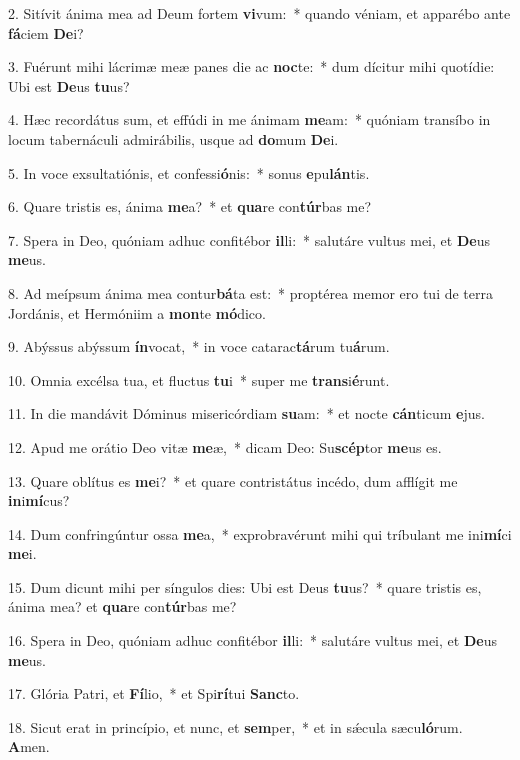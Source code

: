 2. Sitívit ánima mea ad Deum fortem \textbf{vi}vum:~*  quando véniam, et apparébo ante \textbf{fá}ciem \textbf{De}i?\

3. Fuérunt mihi lácrimæ meæ panes die ac \textbf{noc}te:~*  dum dícitur mihi quotídie: Ubi est \textbf{De}us \textbf{tu}us?\

4. Hæc recordátus sum, et effúdi in me ánimam \textbf{me}am:~*  quóniam transíbo in locum tabernáculi admirábilis, usque ad \textbf{do}mum \textbf{De}i.\

5. In voce exsultatiónis, et confessi\textbf{ó}nis:~*  sonus \textbf{e}pu\textbf{lán}tis.\

6. Quare tristis es, ánima \textbf{me}a?~*  et \textbf{qua}re con\textbf{túr}bas me?\

7. Spera in Deo, quóniam adhuc confitébor \textbf{il}li:~*  salutáre vultus mei, et \textbf{De}us \textbf{me}us.\

8. Ad meípsum ánima mea contur\textbf{bá}ta est:~*  proptérea memor ero tui de terra Jordánis, et Hermóniim a \textbf{mon}te \textbf{mó}dico.\

9. Abýssus abýssum \textbf{ín}vocat,~*  in voce catarac\textbf{tá}rum tu\textbf{á}rum.\

10. Omnia excélsa tua, et fluctus \textbf{tu}i~*  super me \textbf{trans}i\textbf{é}runt.\

11. In die mandávit Dóminus misericórdiam \textbf{su}am:~*  et nocte \textbf{cán}ticum \textbf{e}jus.\

12. Apud me orátio Deo vitæ \textbf{me}æ,~*  dicam Deo: Su\textbf{scép}tor \textbf{me}us es.\

13. Quare oblítus es \textbf{me}i?~*  et quare contristátus incédo, dum afflígit me \textbf{in}i\textbf{mí}cus?\

14. Dum confringúntur ossa \textbf{me}a,~*  exprobravérunt mihi qui tríbulant me ini\textbf{mí}ci \textbf{me}i.\

15. Dum dicunt mihi per síngulos dies: Ubi est Deus \textbf{tu}us?~*  quare tristis es, ánima mea? et \textbf{qua}re con\textbf{túr}bas me?\

16. Spera in Deo, quóniam adhuc confitébor \textbf{il}li:~*  salutáre vultus mei, et \textbf{De}us \textbf{me}us.\

17. Glória Patri, et \textbf{Fí}lio,~*  et Spi\textbf{rí}tui \textbf{Sanc}to.\

18. Sicut erat in princípio, et nunc, et \textbf{sem}per,~*  et in sǽcula sæcu\textbf{ló}rum. \textbf{A}men.\

